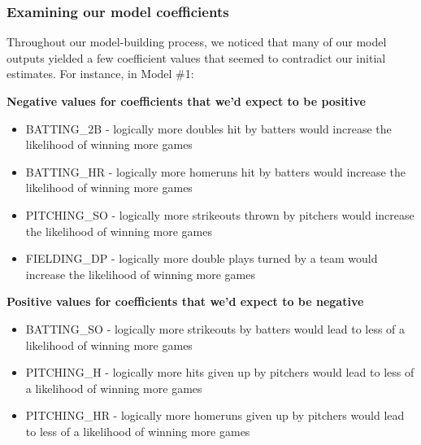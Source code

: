\documentclass[
]{article}
\providecommand{\tightlist}{%
  \setlength{\itemsep}{0pt}\setlength{\parskip}{0pt}}
\begin{document}
\hypertarget{examining-our-model-coefficients}{%
\subsubsection{Examining our model
coefficients}\label{examining-our-model-coefficients}}

Throughout our model-building process, we noticed that many of our model
outputs yielded a few coefficient values that seemed to contradict our
initial estimates. For instance, in Model \#1:

\textbf{Negative values for coefficients that we'd expect to be
positive}

\begin{itemize}
\tightlist
\item
  BATTING\_2B - logically more doubles hit by batters would increase the
  likelihood of winning more games\\
\item
  BATTING\_HR - logically more homeruns hit by batters would increase
  the likelihood of winning more games\\
\item
  PITCHING\_SO - logically more strikeouts thrown by pitchers would
  increase the likelihood of winning more games\\
\item
  FIELDING\_DP - logically more double plays turned by a team would
  increase the likelihood of winning more games
\end{itemize}

\textbf{Positive values for coefficients that we'd expect to be
negative}

\begin{itemize}
\tightlist
\item
  BATTING\_SO - logically more strikeouts by batters would lead to less
  of a likelihood of winning more games\\
\item
  PITCHING\_H - logically more hits given up by pitchers would lead to
  less of a likelihood of winning more games\\
\item
  PITCHING\_HR - logically more homeruns given up by pitchers would lead
  to less of a likelihood of winning more games
\end{itemize}
\end{document}
